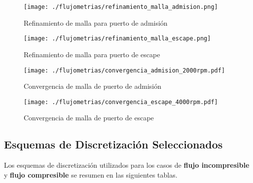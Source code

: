 \begin{figure}[h]
  \centering
  \texttt{[image: ./flujometrias/refinamiento\_malla\_admision.png]}
  \caption{Refinamiento de malla para puerto de admisión}\label{fig:refinamiento_admision}
\end{figure}

\begin{figure}[h]
  \centering
  \texttt{[image: ./flujometrias/refinamiento\_malla\_escape.png]}
  \caption{Refinamiento de malla para puerto de escape}\label{fig:refinamiento_escape}
\end{figure}

\begin{figure}[h]
  \centering
  \texttt{[image: ./flujometrias/convergencia\_admision\_2000rpm.pdf]}
  \caption{Convergencia de malla de puerto de admisión}\label{fig:conv_malla_admision}
\end{figure}

\begin{figure}[h]
  \centering
  \texttt{[image: ./flujometrias/convergencia\_escape\_4000rpm.pdf]}
  \caption{Convergencia de malla de puerto de escape}\label{fig:conv_malla_escape}
\end{figure}



\subsection{Esquemas de Discretización Seleccionados}

Los esquemas de discretización utilizados para los casos de \textbf{flujo incompresible} y \textbf{flujo compresible} se resumen en las siguientes tablas.


